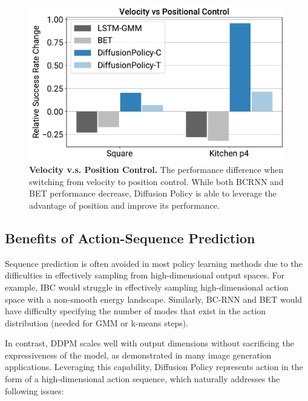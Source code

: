 \documentclass[Afour,sageh,times]{sagej}
\begin{document}
\begin{figure}[h]
\centering
\includegraphics[width=0.85\linewidth]{figure/pos_vs_vel_figure.pdf}
\caption{\textbf{Velocity v.s. Position Control.} \label{fig:pos_vs_vel} The performance difference when switching from velocity to position control. While both BCRNN and BET performance decrease, Diffusion Policy is able to leverage the advantage of position and improve its performance. }
\vspace{-4mm}
\end{figure}



\subsection{Benefits of Action-Sequence Prediction}
\label{sec:action_sequence}



Sequence prediction is often avoided in most policy learning methods due to the difficulties in effectively sampling from high-dimensional output spaces. For example, IBC would struggle in effectively sampling high-dimensional action space with a non-smooth energy landscape. Similarly, BC-RNN and BET would have difficulty specifying the number of modes that exist in the action distribution (needed for GMM or k-means steps).

In contrast, DDPM scales well with output dimensions without sacrificing the expressiveness of the model, as demonstrated in many image generation applications. Leveraging this capability, Diffusion Policy represents action in the form of a high-dimensional action sequence, which naturally addresses the following issues:
\end{document}
